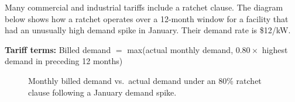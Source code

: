 \documentclass[./main.tex]{subfiles}
\begin{document}
Many commercial and industrial tariffs include a ratchet clause. The diagram
below shows how a ratchet operates over a 12-month window for a facility that
had an unusually high demand spike in January. Their demand rate is \$12/kW.

\medskip
\noindent\textbf{Tariff terms:} Billed demand $=$ max(actual monthly demand,
$0.80 \times$ highest demand in preceding 12 months)
\medskip

\begin{figure}[ht]
  \centering
  \caption{Monthly billed demand vs.\ actual demand under an 80\% ratchet
    clause following a January demand spike.}
\end{figure}
\end{document}
